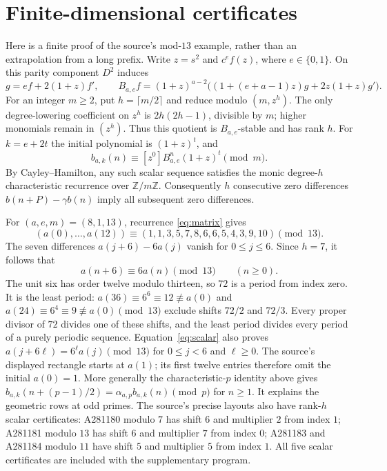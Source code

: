 \documentclass[11pt]{article}
\newcommand{\ZZ}{\mathbb Z}
\begin{document}
\section{Finite-dimensional certificates}\label{sec:finite}
Here is a finite proof of the source's mod-$13$ example, rather than an
extrapolation from a long prefix. Write $z=s^2$ and $c^ef(z)$, where
$e\in\{0,1\}$. On this parity component $D^2$ induces
\begin{equation}\label{eq:matrix}
 g=ef+2(1+z)f',\qquad
 B_{a,e}f=(1+z)^{a-2}\bigl((1+(e+a-1)z)g+2z(1+z)g'\bigr).
\end{equation}
For an integer $m\ge2$, put $h=\lceil m/2\rceil$ and reduce modulo
$(m,z^h)$. The only degree-lowering coefficient on $z^h$ is
$2h(2h-1)$, divisible by $m$; higher monomials remain in $(z^h)$.
Thus this quotient is $B_{a,e}$-stable and has rank $h$.
For $k=e+2t$ the initial polynomial is $(1+z)^t$, and
\[
 b_{a,k}(n)\equiv[z^0]B_{a,e}^n(1+z)^t\pmod m.
\]
By Cayley--Hamilton, any such scalar sequence satisfies the monic
degree-$h$ characteristic recurrence over $\ZZ/m\ZZ$.
Consequently $h$ consecutive zero differences
$b(n+P)-\gamma b(n)$ imply all subsequent zero differences.

For $(a,e,m)=(8,1,13)$, recurrence \eqref{eq:matrix} gives
\[
 (a(0),\ldots,a(12))\equiv(1,1,3,5,7,8,6,6,5,4,3,9,10)\pmod{13}.
\]
The seven differences $a(j+6)-6a(j)$ vanish for $0\le j\le6$.
Since $h=7$, it follows that
\begin{equation}\label{eq:scalar}
 a(n+6)\equiv6a(n)\pmod{13}\qquad(n\ge0).
\end{equation}
The unit six has order twelve modulo thirteen, so $72$ is a period from
index zero. It is the least period: $a(36)\equiv6^6\equiv12\not\equiv a(0)$ and
$a(24)\equiv6^4\equiv9\not\equiv a(0)\pmod{13}$ exclude shifts $72/2$ and $72/3$.
Every proper divisor of $72$ divides one of these shifts, and the least
period divides every period of a purely periodic sequence.
Equation~\eqref{eq:scalar} also proves
$a(j+6\ell)=6^\ell a(j)\pmod{13}$ for $0\le j<6$ and $\ell\ge0$.
The source's displayed rectangle starts at $a(1)$; its first twelve entries
therefore omit the initial $a(0)=1$.
More generally the characteristic-$p$ identity above gives
$b_{a,k}(n+(p-1)/2)=\alpha_{a,p}b_{a,k}(n)\pmod p$ for $n\ge1$.
It explains the geometric rows at odd primes. The source's precise layouts
also have rank-$h$ scalar certificates: A281180 modulo $7$ has shift $6$
and multiplier $2$ from index $1$; A281181 modulo $13$ has shift $6$ and
multiplier $7$ from index $0$; A281183 and A281184 modulo $11$ have
shift $5$ and multiplier $5$ from index $1$. All five scalar certificates
are included with the supplementary program.
\end{document}
